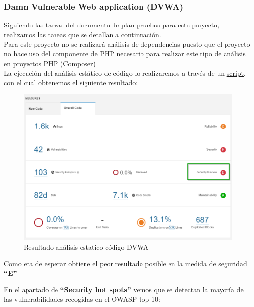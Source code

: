 \newpage

\subsubsection{Damn Vulnerable Web application (DVWA)}
Siguiendo las tareas del \href{https://github.com/M0l1n3ta/PFG/blob/master/Reportes/DVWA/PPR DVWA - Plan Pruebas de Seguridad.docx}{documento de plan pruebas}
para este proyecto, realizamos las tareas que se detallan a continuación.\\

Para este proyecto no se realizará análisis de dependencias puesto que el proyecto no hace uso del componente de PHP 
necesario para realizar este tipo de análisis en proyectos PHP (\href{https://getcomposer.org/}{Composer})\\

La ejecución del análisis estático de código lo realizaremos a través de un
\href{https://github.com/M0l1n3ta/PFG/blob/master/Scripts/STAT/RunSonarScaner_DWVA.ps1}{script}, con el cual obtenemos 
el siguiente resultado:\\

\begin{figure}[!htb]  
    \includegraphics[width=\linewidth]{./imagenes/07_AnalisisEstatico__DVWA.png}
    \caption{Resultado análisis estatico código DVWA}  
    \label{fig:22}
\end{figure}
Como era de esperar obtiene el peor resultado posible en la medida de seguridad \textbf{“E”}

\newpage
En el apartado de \textbf{“Security hot spots”} vemos que se detectan la mayoría de las 
vulnerabilidades recogidas en el OWASP top 10:

